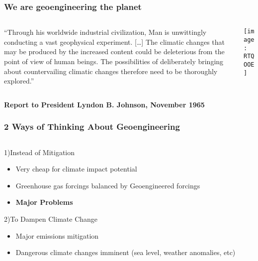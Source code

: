 \documentclass{beamer}
\begin{document}
\begin{frame}
\frametitle{We are geoengineering the planet}
\begin{columns}
\begin{column}{7.5cm}
``Through his worldwide industrial civilization, Man is unwittingly conducting a vast geophysical experiment. [\dots] The climatic changes that may be produced by the increased  content could be deleterious from the point of view of human beings.  The possibilities of deliberately bringing about countervailing climatic changes therefore need to be thoroughly explored.'' 
\end{column}
\begin{column}{4cm}
\texttt{[image: RTQOOE]}
\end{column}
\end{columns}

\begin{center} \bf\large
Report to President Lyndon B. Johnson, November 1965
\end{center}
\end{frame}

\begin{frame}
\frametitle{2 Ways of Thinking About Geoengineering}
\begin{columns}
\begin{column}{7.5cm}
\centering
\begin{block}{1)\quad Instead of  Mitigation}
\begin{itemize}
	\item Very cheap for climate impact potential
	\item Greenhouse gas forcings balanced by Geoengineered forcings
	\item \bf{Major Problems}
\end{itemize}
\end{block}
\begin{block}{2)\quad To Dampen Climate Change}
\begin{itemize}
	\item Major emissions mitigation
	\item Dangerous climate changes imminent (sea level, weather anomalies, etc) 
\end{itemize}
\end{block}
\end{column}
\end{columns}
\end{frame}
\end{document}
